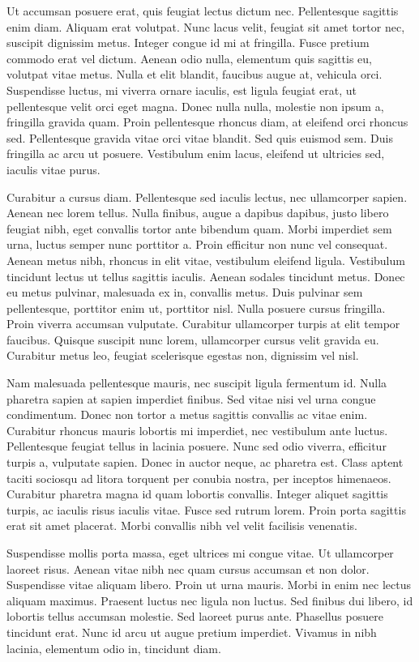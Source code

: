 \documentclass[english,fleqn]{ieej-tec2}%
\begin{document}
{Ut accumsan posuere erat, quis feugiat lectus dictum nec. Pellentesque sagittis enim diam. Aliquam erat volutpat. Nunc lacus velit, feugiat sit amet tortor nec, suscipit dignissim metus. Integer congue id mi at fringilla. Fusce pretium commodo erat vel dictum. Aenean odio nulla, elementum quis sagittis eu, volutpat vitae metus. Nulla et elit blandit, faucibus augue at, vehicula orci. Suspendisse luctus, mi viverra ornare iaculis, est ligula feugiat erat, ut pellentesque velit orci eget magna. Donec nulla nulla, molestie non ipsum a, fringilla gravida quam. Proin pellentesque rhoncus diam, at eleifend orci rhoncus sed. Pellentesque gravida vitae orci vitae blandit. Sed quis euismod sem. Duis fringilla ac arcu ut posuere. Vestibulum enim lacus, eleifend ut ultricies sed, iaculis vitae purus.

Curabitur a cursus diam. Pellentesque sed iaculis lectus, nec ullamcorper sapien. Aenean nec lorem tellus. Nulla finibus, augue a dapibus dapibus, justo libero feugiat nibh, eget convallis tortor ante bibendum quam. Morbi imperdiet sem urna, luctus semper nunc porttitor a. Proin efficitur non nunc vel consequat. Aenean metus nibh, rhoncus in elit vitae, vestibulum eleifend ligula. Vestibulum tincidunt lectus ut tellus sagittis iaculis. Aenean sodales tincidunt metus. Donec eu metus pulvinar, malesuada ex in, convallis metus. Duis pulvinar sem pellentesque, porttitor enim ut, porttitor nisl. Nulla posuere cursus fringilla. Proin viverra accumsan vulputate. Curabitur ullamcorper turpis at elit tempor faucibus. Quisque suscipit nunc lorem, ullamcorper cursus velit gravida eu. Curabitur metus leo, feugiat scelerisque egestas non, dignissim vel nisl.

Nam malesuada pellentesque mauris, nec suscipit ligula fermentum id. Nulla pharetra sapien at sapien imperdiet finibus. Sed vitae nisi vel urna congue condimentum. Donec non tortor a metus sagittis convallis ac vitae enim. Curabitur rhoncus mauris lobortis mi imperdiet, nec vestibulum ante luctus. Pellentesque feugiat tellus in lacinia posuere. Nunc sed odio viverra, efficitur turpis a, vulputate sapien. Donec in auctor neque, ac pharetra est. Class aptent taciti sociosqu ad litora torquent per conubia nostra, per inceptos himenaeos. Curabitur pharetra magna id quam lobortis convallis. Integer aliquet sagittis turpis, ac iaculis risus iaculis vitae. Fusce sed rutrum lorem. Proin porta sagittis erat sit amet placerat. Morbi convallis nibh vel velit facilisis venenatis.

Suspendisse mollis porta massa, eget ultrices mi congue vitae. Ut ullamcorper laoreet risus. Aenean vitae nibh nec quam cursus accumsan et non dolor. Suspendisse vitae aliquam libero. Proin ut urna mauris. Morbi in enim nec lectus aliquam maximus. Praesent luctus nec ligula non luctus. Sed finibus dui libero, id lobortis tellus accumsan molestie. Sed laoreet purus ante. Phasellus posuere tincidunt erat. Nunc id arcu ut augue pretium imperdiet. Vivamus in nibh lacinia, elementum odio in, tincidunt diam.

}
\end{document}

